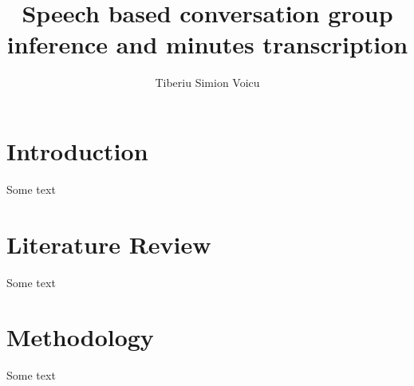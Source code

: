 \title{Speech based conversation group inference and minutes transcription}
\author{Tiberiu Simion Voicu}

\section{Introduction}
Some text
\section{Literature Review}
Some text
\section{Methodology}
Some text


